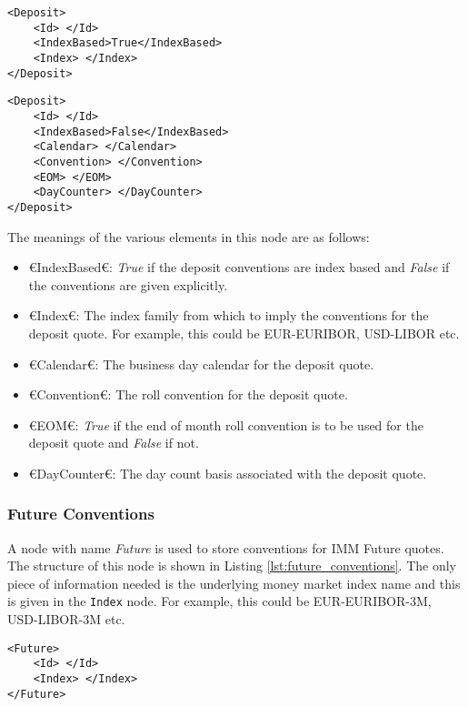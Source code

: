 \begin{lstlisting}[caption={Deposit conventions, index based}, label=lst:deposit_conventions_index]
<Deposit>
	<Id> </Id>
	<IndexBased>True</IndexBased>
	<Index> </Index>
</Deposit>
\end{lstlisting}

\begin{lstlisting}[caption={Deposit conventions, explicit}, label=lst:deposit_conventions_explicit]
<Deposit>
	<Id> </Id>
	<IndexBased>False</IndexBased>
	<Calendar> </Calendar>
	<Convention> </Convention>
	<EOM> </EOM>
	<DayCounter> </DayCounter>
</Deposit>
\end{lstlisting}

The meanings of the various elements in this node are as follows:
\begin{itemize}
\item €IndexBased€: \emph{True} if the deposit conventions are index based and \emph{False} if the conventions are given 
explicitly.
\item €Index€: The index family from which to imply the conventions for the deposit quote. For example, this could be 
EUR-EURIBOR, USD-LIBOR etc.
\item €Calendar€: The business day calendar for the deposit quote.
\item €Convention€: The roll convention for the deposit quote.
\item €EOM€: \emph{True} if the end of month roll convention is to be used for the deposit quote and \emph{False} if not.
\item €DayCounter€: The day count basis associated with the deposit quote.
\end{itemize}

\subsubsection{Future Conventions}
A node with name \emph{Future} is used to store conventions for IMM Future quotes. The structure of this node is shown in 
Listing \ref{lst:future_conventions}. The only piece of information needed is the underlying money market index name and 
this is given in the \lstinline!Index! node. For example, this could be EUR-EURIBOR-3M, USD-LIBOR-3M etc.

\begin{lstlisting}[caption={Future conventions}, label=lst:future_conventions]
<Future>
	<Id> </Id>
	<Index> </Index>
</Future>
\end{lstlisting}

